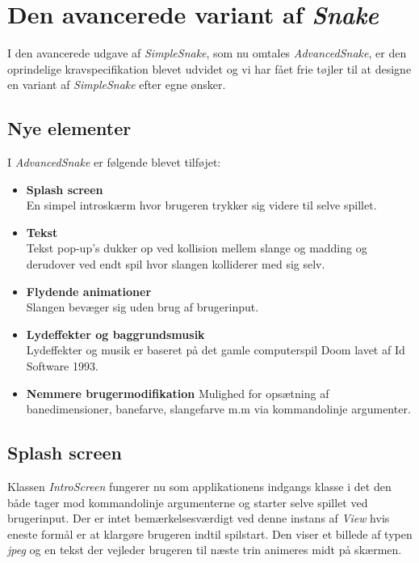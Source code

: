 \documentclass[]{article}
\begin{document}
	\section{Den avancerede variant af \textit{Snake}}
	
	I den avancerede udgave af \textit{SimpleSnake}, som nu omtales \textit{AdvancedSnake}, er den oprindelige kravspecifikation blevet udvidet og vi har fået frie tøjler til at designe en variant af \textit{SimpleSnake} efter egne ønsker. 
	
	\subsection{Nye elementer}
	I \textit{AdvancedSnake} er følgende blevet tilføjet:
	\begin{itemize}
		\item \textbf{Splash screen} \\
		En simpel introskærm hvor brugeren trykker sig videre til selve spillet.
		\item \textbf{Tekst} \\
		Tekst pop-up's dukker op ved kollision mellem slange og madding og derudover ved endt spil hvor slangen kolliderer med sig selv.
		\item \textbf{Flydende animationer} \\
		Slangen bevæger sig uden brug af brugerinput.
		\item \textbf{Lydeffekter og baggrundsmusik} \\
		Lydeffekter og musik er baseret på det gamle computerspil Doom lavet af Id Software 1993.
		\item \textbf{Nemmere brugermodifikation}
		Mulighed for opsætning af banedimensioner, banefarve, slangefarve m.m via kommandolinje argumenter.
		
	\end{itemize}
	
	\subsection{Splash screen}
	
	Klassen \textit{IntroScreen} fungerer nu som applikationens indgangs klasse i det den både tager mod kommandolinje argumenterne og starter selve spillet ved brugerinput. Der er intet bemærkelsesværdigt ved denne instans af \textit{View} hvis eneste formål er at klargøre brugeren indtil spilstart. Den viser et billede af typen \textit{jpeg} og en tekst der vejleder brugeren til næste trin animeres midt på skærmen.
	
\end{document}
